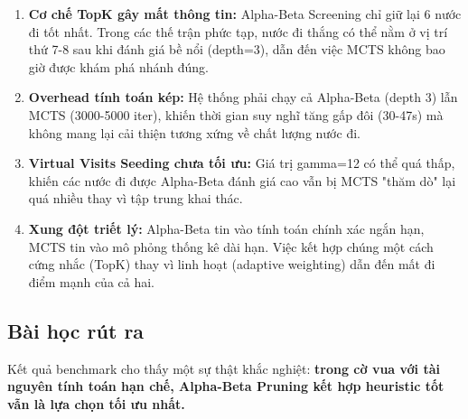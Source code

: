 \begin{enumerate}
    \item \textbf{Cơ chế TopK gây mất thông tin:} Alpha-Beta Screening chỉ giữ lại 6 nước đi tốt nhất. Trong các thế trận phức tạp, nước đi thắng có thể nằm ở vị trí thứ 7-8 sau khi đánh giá bề nổi (depth=3), dẫn đến việc MCTS không bao giờ được khám phá nhánh đúng.
    
    \item \textbf{Overhead tính toán kép:} Hệ thống phải chạy cả Alpha-Beta (depth 3) lẫn MCTS (3000-5000 iter), khiến thời gian suy nghĩ tăng gấp đôi (30-47s) mà không mang lại cải thiện tương xứng về chất lượng nước đi.
    
    \item \textbf{Virtual Visits Seeding chưa tối ưu:} Giá trị gamma=12 có thể quá thấp, khiến các nước đi được Alpha-Beta đánh giá cao vẫn bị MCTS "thăm dò" lại quá nhiều thay vì tập trung khai thác.
    
    \item \textbf{Xung đột triết lý:} Alpha-Beta tin vào tính toán chính xác ngắn hạn, MCTS tin vào mô phỏng thống kê dài hạn. Việc kết hợp chúng một cách cứng nhắc (TopK) thay vì linh hoạt (adaptive weighting) dẫn đến mất đi điểm mạnh của cả hai.
\end{enumerate}

\subsection{Bài học rút ra}

Kết quả benchmark cho thấy một sự thật khắc nghiệt: \textbf{trong cờ vua với tài nguyên tính toán hạn chế, Alpha-Beta Pruning kết hợp heuristic tốt vẫn là lựa chọn tối ưu nhất.}

